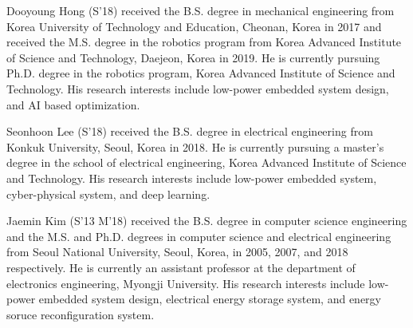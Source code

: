 \documentclass[journal]{./template/IEEEtran}
\begin{document}
\begin{IEEEbiography}{Dooyoung Hong}
(S'18) received the B.S. degree in mechanical engineering from Korea University of Technology and Education, Cheonan, Korea in 2017 and received the M.S. degree in the robotics program from Korea Advanced Institute of Science and Technology, Daejeon, Korea in 2019. He is currently pursuing Ph.D. degree in the robotics program, Korea Advanced Institute of Science and Technology. His research interests include low-power embedded system design, and AI based optimization.
\end{IEEEbiography}

\begin{IEEEbiography}{Seonhoon Lee}
(S'18) received the B.S. degree in electrical engineering from Konkuk University, Seoul, Korea in 2018. He is currently pursuing a master’s degree in the school of electrical engineering, Korea Advanced Institute of Science and Technology. His research interests include low-power embedded system, cyber-physical system, and deep learning.
\end{IEEEbiography}

\begin{IEEEbiography}{Jaemin Kim}
(S'13 M'18) received the B.S. degree in computer science engineering and the M.S. and Ph.D. degrees in computer science and electrical engineering from Seoul National University, Seoul, Korea, in 2005, 2007, and 2018 respectively. He is currently an assistant professor at the department of electronics engineering, Myongji University. His research interests include low-power embedded system design, electrical energy storage system, and energy soruce reconfiguration system.
\end{IEEEbiography}
\end{document}
